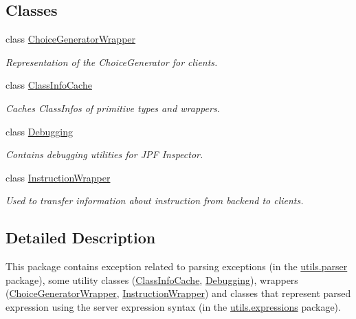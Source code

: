\subsection*{Classes}
\begin{DoxyCompactItemize}
\item 
class \hyperlink{classgov_1_1nasa_1_1jpf_1_1inspector_1_1utils_1_1_choice_generator_wrapper}{Choice\+Generator\+Wrapper}
\begin{DoxyCompactList}\small\item\em Representation of the Choice\+Generator for clients. \end{DoxyCompactList}\item 
class \hyperlink{classgov_1_1nasa_1_1jpf_1_1inspector_1_1utils_1_1_class_info_cache}{Class\+Info\+Cache}
\begin{DoxyCompactList}\small\item\em Caches Class\+Infos of primitive types and wrappers. \end{DoxyCompactList}\item 
class \hyperlink{classgov_1_1nasa_1_1jpf_1_1inspector_1_1utils_1_1_debugging}{Debugging}
\begin{DoxyCompactList}\small\item\em Contains debugging utilities for J\+PF Inspector. \end{DoxyCompactList}\item 
class \hyperlink{classgov_1_1nasa_1_1jpf_1_1inspector_1_1utils_1_1_instruction_wrapper}{Instruction\+Wrapper}
\begin{DoxyCompactList}\small\item\em Used to transfer information about instruction from backend to clients. \end{DoxyCompactList}\end{DoxyCompactItemize}


\subsection{Detailed Description}
This package contains exception related to parsing exceptions (in the \hyperlink{namespacegov_1_1nasa_1_1jpf_1_1inspector_1_1utils_1_1parser}{utils.\+parser} package), some utility classes (\hyperlink{classgov_1_1nasa_1_1jpf_1_1inspector_1_1utils_1_1_class_info_cache}{Class\+Info\+Cache}, \hyperlink{classgov_1_1nasa_1_1jpf_1_1inspector_1_1utils_1_1_debugging}{Debugging}), wrappers (\hyperlink{classgov_1_1nasa_1_1jpf_1_1inspector_1_1utils_1_1_choice_generator_wrapper}{Choice\+Generator\+Wrapper}, \hyperlink{classgov_1_1nasa_1_1jpf_1_1inspector_1_1utils_1_1_instruction_wrapper}{Instruction\+Wrapper}) and classes that represent parsed expression using the server expression syntax (in the \hyperlink{namespacegov_1_1nasa_1_1jpf_1_1inspector_1_1utils_1_1expressions}{utils.\+expressions} package). 